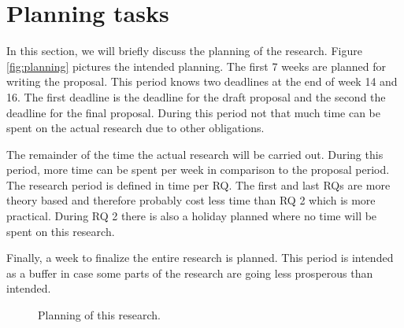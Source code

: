\section{Planning tasks}
In this section, we will briefly discuss the planning of the research. Figure \ref{fig:planning} pictures the intended planning. The first 7 weeks are planned for writing the proposal. This period knows two deadlines at the end of week 14 and 16. The first deadline is the deadline for the draft proposal and the second the deadline for the final proposal. During this period not that much time can be spent on the actual research due to other obligations. 

The remainder of the time the actual research will be carried out. During this period, more time can be spent per week in comparison to the proposal period. The research period is defined in time per RQ. The first and last RQs are more theory based and therefore probably cost less time than RQ 2 which is more practical. During RQ 2 there is also a holiday planned where no time will be spent on this research. 

Finally, a week to finalize the entire research is planned. This period is intended as a buffer in case some parts of the research are going less prosperous than intended. 


\begin{figure}
\centering
%
\noindent{}
\caption{Planning of this research.}
\end{figure}\label{fig:planning}


